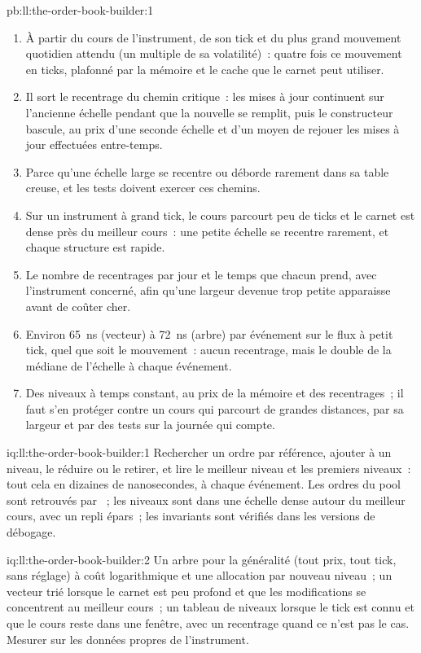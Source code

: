 \begin{solution}{pb:ll:the-order-book-builder:1}
\begin{enumerate}
\item À partir du cours de l'instrument, de son tick et du plus grand mouvement quotidien attendu (un multiple de sa volatilité)~: quatre fois
ce mouvement en ticks, plafonné par la mémoire et le cache que le carnet peut utiliser.
\item Il sort le recentrage du chemin critique~: les mises à jour continuent sur l'ancienne échelle pendant que la nouvelle se remplit, puis le
constructeur bascule, au prix d'une seconde échelle et d'un moyen de rejouer les mises à jour effectuées entre-temps.
\item Parce qu'une échelle large se recentre ou déborde rarement dans sa table creuse, et les tests doivent exercer ces chemins.
\item Sur un instrument à grand tick, le cours parcourt peu de ticks et le carnet est dense près du meilleur cours~: une petite échelle se
recentre rarement, et chaque structure est rapide.
\item Le nombre de recentrages par jour et le temps que chacun prend, avec l'instrument concerné, afin qu'une largeur devenue trop petite
apparaisse avant de coûter cher.
\item Environ \qty{65}{\nano\second} (vecteur) à \qty{72}{\nano\second} (arbre) par événement sur le flux à petit tick, quel que soit le mouvement~: aucun recentrage, mais le double de la
médiane de l'échelle à chaque événement.
\item Des niveaux à temps constant, au prix de la mémoire et des recentrages~; il faut s'en protéger contre un cours qui parcourt
de grandes distances, par sa largeur et par des tests sur la journée qui compte.
\end{enumerate}
\end{solution}

\begin{solution}{iq:ll:the-order-book-builder:1}
Rechercher un ordre par référence, ajouter à un niveau, le réduire ou le retirer, et lire le meilleur niveau et les premiers niveaux~: tout cela en
dizaines de nanosecondes, à chaque événement. Les ordres du pool sont retrouvés par ~; les niveaux sont dans une échelle dense autour du meilleur cours, avec un
repli épars~; les invariants sont vérifiés dans les versions de débogage.
\end{solution}

\begin{solution}{iq:ll:the-order-book-builder:2}
Un arbre pour la généralité (tout prix, tout tick, sans réglage) à coût logarithmique et une allocation par nouveau niveau~; un vecteur trié
lorsque le carnet est peu profond et que les modifications se concentrent au meilleur cours~; un tableau de niveaux lorsque le tick est connu et que le cours reste
dans une fenêtre, avec un recentrage quand ce n'est pas le cas. Mesurer sur les données propres de l'instrument.
\end{solution}

